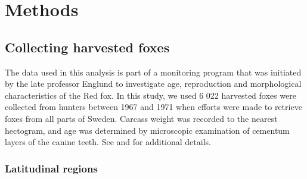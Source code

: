 \documentclass[12pt,a4paper,final,abstract=true,headings=small]{scrartcl}
\begin{document}


\section*{Methods}

\subsection*{Collecting harvested foxes}

The data used in this analysis is part of a monitoring program that was initiated by the late professor Englund to investigate age, reproduction and morphological characteristics of the Red fox. In this study, we used 6 022 harvested foxes were collected from hunters between 1967 and 1971 when efforts were made to retrieve foxes from all parts of Sweden. Carcass weight was recorded to the nearest hectogram, and age was determined by microscopic examination of cementum layers of the canine teeth.  See \citep{englund1965studies} and \cite{englund1970some} for additional details.

\subsubsection*{Latitudinal regions}



\end{document}
